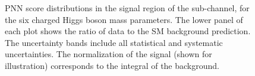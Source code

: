 \begin{figure}
		\caption{\label{fig:taulepPNNscoreSR1_body} PNN score distributions in the
		signal region of the \tauel sub-channel, for the six charged Higgs boson mass parameters.
		The lower panel of each plot shows the ratio of data to the SM background prediction. The uncertainty bands include all statistical and systematic uncertainties.
		The normalization of the signal (shown for illustration) corresponds to the integral of the background.}
		\end{figure}

